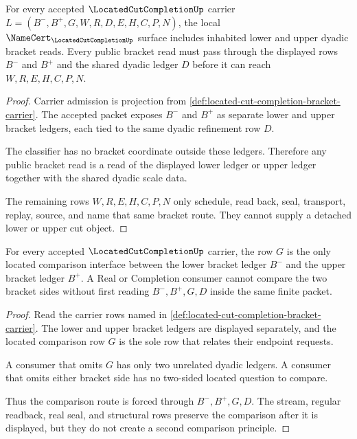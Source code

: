 \begin{theorem}\label{thm:located-cut-completion-bracket-inhabitation}
For every accepted $\LocatedCutCompletionUp$ carrier $L=(B^{-},B^{+},G,W,R,D,E,H,C,P,N)$, the local $\NameCert_{\LocatedCutCompletionUp}$ surface includes inhabited lower and upper dyadic bracket reads. Every public bracket read must pass through the displayed rows $B^{-}$ and $B^{+}$ and the shared dyadic ledger $D$ before it can reach $W,R,E,H,C,P,N$.
\end{theorem}
\begin{proof}
Carrier admission is projection from \autoref{def:located-cut-completion-bracket-carrier}. The accepted packet exposes $B^{-}$ and $B^{+}$ as separate lower and upper bracket ledgers, each tied to the same dyadic refinement row $D$.

The classifier has no bracket coordinate outside these ledgers. Therefore any public bracket read is a read of the displayed lower ledger or upper ledger together with the shared dyadic scale data.

The remaining rows $W,R,E,H,C,P,N$ only schedule, read back, seal, transport, replay, source, and name that same bracket route. They cannot supply a detached lower or upper cut object.
\end{proof}

\begin{theorem}\label{thm:located-cut-completion-located-comparison}
For every accepted $\LocatedCutCompletionUp$ carrier, the row $G$ is the only located comparison interface between the lower bracket ledger $B^{-}$ and the upper bracket ledger $B^{+}$. A Real or Completion consumer cannot compare the two bracket sides without first reading $B^{-},B^{+},G,D$ inside the same finite packet.
\end{theorem}
\begin{proof}
Read the carrier rows named in \autoref{def:located-cut-completion-bracket-carrier}. The lower and upper bracket ledgers are displayed separately, and the located comparison row $G$ is the sole row that relates their endpoint requests.

A consumer that omits $G$ has only two unrelated dyadic ledgers. A consumer that omits either bracket side has no two-sided located question to compare.

Thus the comparison route is forced through $B^{-},B^{+},G,D$. The stream, regular readback, real seal, and structural rows preserve the comparison after it is displayed, but they do not create a second comparison principle.
\end{proof}

